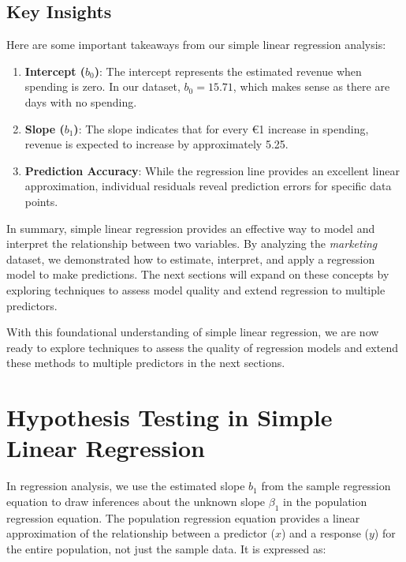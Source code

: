 \documentclass[
]{book}
\providecommand{\tightlist}{%
  \setlength{\itemsep}{0pt}\setlength{\parskip}{0pt}}
\theoremstyle{definition}
\theoremstyle{definition}
\theoremstyle{definition}
\theoremstyle{definition}
\theoremstyle{remark}
\begin{document}
\subsection*{Key Insights}\label{key-insights-1}

Here are some important takeaways from our simple linear regression analysis:

\begin{enumerate}
\def\labelenumi{\arabic{enumi}.}
\tightlist
\item
  \textbf{Intercept (\(b_0\))}: The intercept represents the estimated revenue when spending is zero. In our dataset, \(b_0 = 15.71\), which makes sense as there are days with no spending.\\
\item
  \textbf{Slope (\(b_1\))}: The slope indicates that for every €1 increase in spending, revenue is expected to increase by approximately 5.25.\\
\item
  \textbf{Prediction Accuracy}: While the regression line provides an excellent linear approximation, individual residuals reveal prediction errors for specific data points.
\end{enumerate}

In summary, simple linear regression provides an effective way to model and interpret the relationship between two variables. By analyzing the \emph{marketing} dataset, we demonstrated how to estimate, interpret, and apply a regression model to make predictions. The next sections will expand on these concepts by exploring techniques to assess model quality and extend regression to multiple predictors.

With this foundational understanding of simple linear regression, we are now ready to explore techniques to assess the quality of regression models and extend these methods to multiple predictors in the next sections.

\section{Hypothesis Testing in Simple Linear Regression}\label{hypothesis-testing-in-simple-linear-regression}

In regression analysis, we use the estimated slope \(b_1\) from the sample regression equation to draw inferences about the unknown slope \(\beta_1\) in the population regression equation. The population regression equation provides a linear approximation of the relationship between a predictor (\(x\)) and a response (\(y\)) for the entire population, not just the sample data. It is expressed as:
\end{document}
